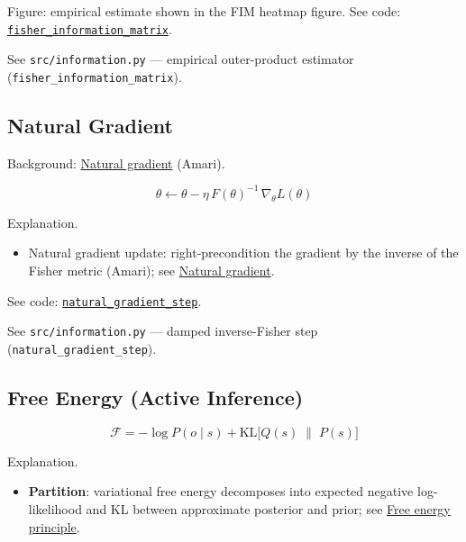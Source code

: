 \documentclass[
  10pt,
]{article}
\providecommand{\tightlist}{%
  \setlength{\itemsep}{0pt}\setlength{\parskip}{0pt}}
\begin{document}
Figure: empirical estimate shown in the FIM heatmap figure. See code:
\href{03_quadray_methods.md\#code:fisher_information_matrix}{\texttt{fisher\_information\_matrix}}.

See \texttt{src/information.py} --- empirical outer-product estimator
(\texttt{fisher\_information\_matrix}).

\hypertarget{eq:natgrad}{%
\subsection{Natural Gradient}\label{eq:natgrad}}

Background:
\href{https://en.wikipedia.org/wiki/Natural_gradient}{Natural gradient}
(Amari).

\begin{equation}\label{eq:supp_natgrad}
\theta \leftarrow \theta - \eta\, F(\theta)^{-1}\, \nabla_{\theta} L(\theta)
\end{equation}

Explanation.

\begin{itemize}
\tightlist
\item
  Natural gradient update: right-precondition the gradient by the
  inverse of the Fisher metric (Amari); see
  \href{https://en.wikipedia.org/wiki/Natural_gradient}{Natural
  gradient}.
\end{itemize}

See code:
\href{03_quadray_methods.md\#code:natural_gradient_step}{\texttt{natural\_gradient\_step}}.

See \texttt{src/information.py} --- damped inverse-Fisher step
(\texttt{natural\_gradient\_step}).

\hypertarget{eq:free_energy}{%
\subsection{Free Energy (Active Inference)}\label{eq:free_energy}}

\begin{equation}\label{eq:supp_free_energy}
\mathcal{F} = -\log P(o\mid s) + \mathrm{KL}\big[ Q(s)\;\|\; P(s) \big]
\end{equation}

Explanation.

\begin{itemize}
\tightlist
\item
  \textbf{Partition}: variational free energy decomposes into expected
  negative log-likelihood and KL between approximate posterior and
  prior; see
  \href{https://en.wikipedia.org/wiki/Free_energy_principle}{Free energy
  principle}.
\end{itemize}
\end{document}
